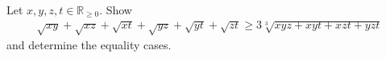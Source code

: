 Let $x,y,z,t \in \mathbb{R}_{\geq 0}$. Show
\begin{align*} \sqrt{xy}+\sqrt{xz}+\sqrt{xt}+\sqrt{yz}+\sqrt{yt}+\sqrt{zt} \geq 3 \sqrt[3]{xyz+xyt+xzt+yzt} \end{align*}and determine the equality cases.